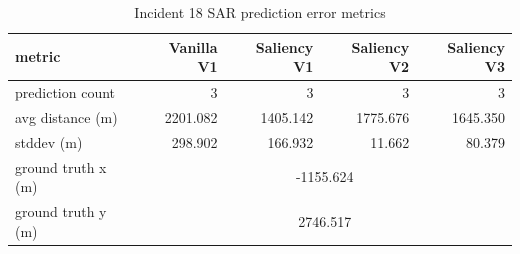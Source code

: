 \begin{table}[ht]
\centering
\caption{Incident 18 SAR prediction error metrics}
\label{tab:sar-incident-18}
\begin{tabular}{lrrrr}
\hline
metric & Vanilla V1 & Saliency V1 & Saliency V2 & Saliency V3 \\
\hline
prediction count & 3 & 3 & 3 & 3 \\
avg distance (m) & 2201.082 & 1405.142 & 1775.676 & 1645.350 \\
stddev (m) & 298.902 & 166.932 & 11.662 & 80.379 \\
ground truth x (m) & \multicolumn{4}{c}{-1155.624} \\
ground truth y (m) & \multicolumn{4}{c}{2746.517} \\
\hline
\end{tabular}
\end{table}

